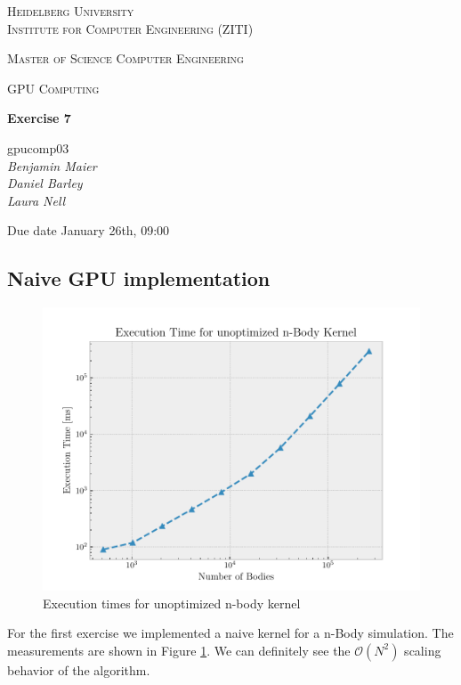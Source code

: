 \documentclass[12pt]{article}
\newcommand{\lecture}{GPU Computing}
\newcommand{\exercise}{Exercise 7}
\newcommand{\groupnumber}{gpucomp03}
\newcommand{\groupmemberslist}{Benjamin Maier\\Daniel Barley\\Laura Nell}
\newcommand{\duedate}{January 26th, 09:00}
\begin{document}
	\begin{titlepage}
		\centering

		{\scshape\LARGE Heidelberg University\\Institute for Computer Engineering (ZITI) \par}
		\vspace{1.5cm}
		{\scshape\Large Master of Science Computer Engineering \par}
		\vspace{0.5cm}
		{\scshape\Large \lecture \par}
		\vspace{1.5cm}
		{\huge\bfseries \exercise \par}
		\vspace{2cm}
		{\Large \groupnumber \itshape \\ \vspace{30pt} \groupmemberslist \par}
		\vfill
		
		
		{\large Due date \duedate \par}
	\end{titlepage}

\setcounter{section}{7}

\subsection{Naive GPU implementation}
\begin{figure}[H]
	\centering
	\includegraphics[width=0.9\linewidth]{./plot/time_vs_elems_unopt.pdf}
	\caption{Execution times for unoptimized n-body kernel}%
	\label{fig:time_vs_elems_unopt}
\end{figure}
For the first exercise we implemented a naive kernel for a n-Body simulation. The measurements are shown in Figure \ref{fig:time_vs_elems_unopt}. We can definitely see the $\mathcal O(N^2)$ scaling behavior of the algorithm.
\end{document}

